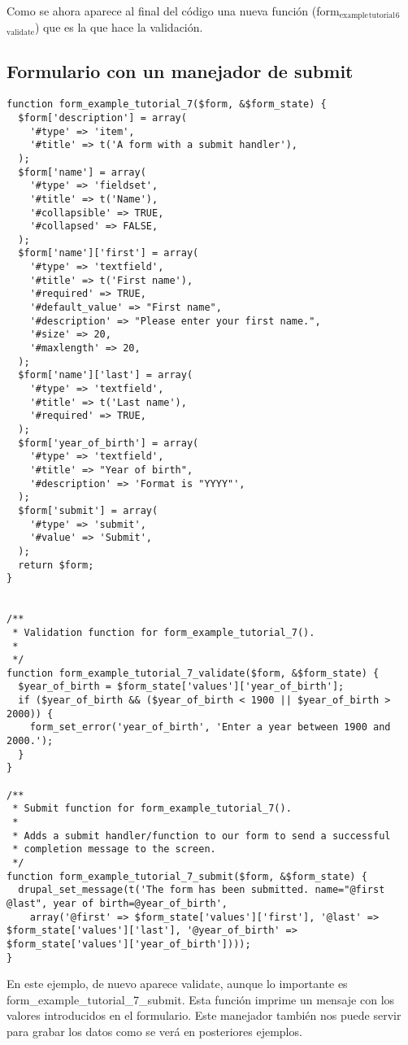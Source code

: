 \documentclass[11pt]{article}
\begin{document}
Como se ahora aparece al final del código una nueva función
(form$_{\mathrm{example}}$$_{\mathrm{tutorial}}$$_6$$_{\mathrm{validate}}$) que es la que hace la validación.

\subsection{Formulario con un manejador de submit}
\label{sec-4.9}



\begin{verbatim}
function form_example_tutorial_7($form, &$form_state) {
  $form['description'] = array(
    '#type' => 'item',
    '#title' => t('A form with a submit handler'),
  );
  $form['name'] = array(
    '#type' => 'fieldset',
    '#title' => t('Name'),
    '#collapsible' => TRUE,
    '#collapsed' => FALSE,
  );
  $form['name']['first'] = array(
    '#type' => 'textfield',
    '#title' => t('First name'),
    '#required' => TRUE,
    '#default_value' => "First name",
    '#description' => "Please enter your first name.",
    '#size' => 20,
    '#maxlength' => 20,
  );
  $form['name']['last'] = array(
    '#type' => 'textfield',
    '#title' => t('Last name'),
    '#required' => TRUE,
  );
  $form['year_of_birth'] = array(
    '#type' => 'textfield',
    '#title' => "Year of birth",
    '#description' => 'Format is "YYYY"',
  );
  $form['submit'] = array(
    '#type' => 'submit',
    '#value' => 'Submit',
  );
  return $form;
}


/**
 * Validation function for form_example_tutorial_7().
 *
 */
function form_example_tutorial_7_validate($form, &$form_state) {
  $year_of_birth = $form_state['values']['year_of_birth'];
  if ($year_of_birth && ($year_of_birth < 1900 || $year_of_birth > 2000)) {
    form_set_error('year_of_birth', 'Enter a year between 1900 and 2000.');
  }
}

/**
 * Submit function for form_example_tutorial_7().
 *
 * Adds a submit handler/function to our form to send a successful
 * completion message to the screen.
 */
function form_example_tutorial_7_submit($form, &$form_state) {
  drupal_set_message(t('The form has been submitted. name="@first @last", year of birth=@year_of_birth',
    array('@first' => $form_state['values']['first'], '@last' => $form_state['values']['last'], '@year_of_birth' => $form_state['values']['year_of_birth'])));
}
\end{verbatim}



En este ejemplo, de nuevo aparece validate, aunque lo importante es
form\_example\_tutorial\_7\_submit. Esta función imprime un mensaje con
los valores introducidos en el formulario. Este manejador también nos
puede servir para grabar los datos como se verá en posteriores
ejemplos.
\end{document}
